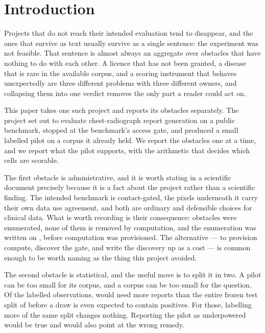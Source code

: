 \section{Introduction}

Projects that do not reach their intended evaluation tend to disappear, and
the ones that survive as text usually survive as a single sentence: the
experiment was not feasible. That sentence is almost always an aggregate over
obstacles that have nothing to do with each other. A licence that has not been
granted, a disease that is rare in the available corpus, and a scoring
instrument that behaves unexpectedly are three different problems with three
different owners, and collapsing them into one verdict removes the only part a
reader could act on.

This paper takes one such project and reports its obstacles separately. The
project set out to evaluate chest-radiograph report generation on a public
benchmark, stopped at the benchmark's access gate, and produced a small
labelled pilot on a corpus it already held. We report the obstacles one at a
time, and we report what the pilot supports, with the arithmetic that decides
which cells are scorable.

The first obstacle is administrative, and it is worth stating in a scientific
document precisely because it is a fact about the project rather than a
scientific finding. The intended benchmark is contact-gated, the pixels
underneath it carry their own data use agreement, and both are ordinary and
defensible choices for clinical data. What is worth recording is their
consequence: \NLocks{} obstacles were enumerated, none of them is removed by
computation, and the enumeration was written on \BlockerDate{}, before
computation was provisioned. The alternative --- to provision compute,
discover the gate, and write the discovery up as a cost --- is common enough
to be worth naming as the thing this project avoided.

The second obstacle is statistical, and the useful move is to split it in two.
A pilot can be too small for its corpus, and a corpus can be too small for the
question. Of the \NFindings{} labelled observations, \NExceedSplit{} would need
more reports than the entire frozen test split of \NTest{} before a draw is
even expected to contain \MinPresent{} positives. For those, labelling more of
the same split changes nothing. Reporting the pilot as underpowered would be
true and would also point at the wrong remedy.

